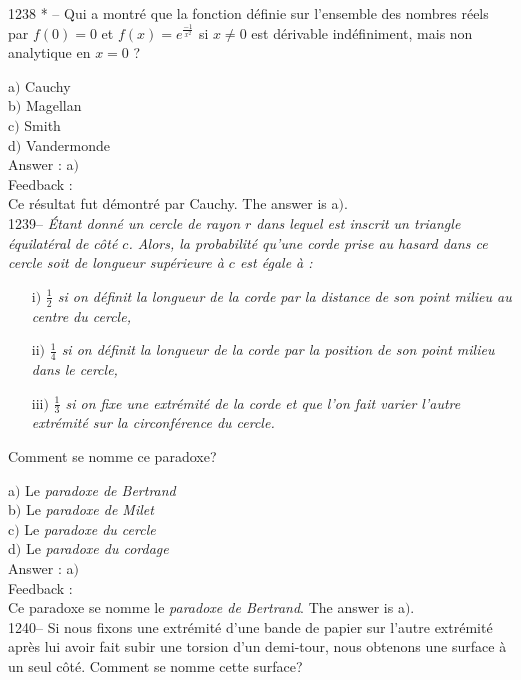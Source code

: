 \documentclass[letterpaper, 12pt]{article}
\begin{document}
1238 * -- Qui a montr\'e que la fonction d\'efinie sur l'ensemble
des nombres r\'eels par $f(0)=0$ et $f(x)=e^{\frac{-1}{x^2}}$ si
$x\not=0$ est d\'erivable ind\'efiniment, mais non analytique en
$x=0$ ?

a$)$ Cauchy \\
b$)$ Magellan \\
c$)$ Smith \\
d$)$ Vandermonde \\

Answer : a$)$\\

Feedback : \\
Ce r\'esultat fut d\'emontr\'e par Cauchy.
The answer is a$)$.\\

1239-- {\sl \'Etant donn\'e un cercle de rayon $r$ dans lequel est
inscrit un triangle \'equilat\'eral de c\^ot\'e $c$. Alors, la
probabilit\'e qu'une corde prise au hasard dans ce cercle soit de
longueur sup\'erieure \`a $c$ est \'egale \`a :}
\begin{enumerate}
\item[i$)$]{\sl $\frac12$ si on d\'efinit la longueur de la corde par la
distance de son point milieu au centre du cercle,}
\item[ii$)$]{\sl $\frac14$ si on d\'efinit la longueur de la corde par la
position de son point milieu dans le cercle,}
\item[iii$)$]{\sl $\frac13$ si on fixe une extr\'emit\'e de la corde et que
l'on fait varier l'autre extr\'emit\'e sur la circonf\'erence du cercle.}
\end{enumerate}
Comment se nomme ce paradoxe?

a$)$ Le {\sl paradoxe de Bertrand} \\
b$)$ Le {\sl paradoxe de Milet} \\
c$)$ Le {\sl paradoxe du cercle}  \\
d$)$ Le {\sl paradoxe du cordage}\\

Answer : a$)$\\

Feedback : \\
Ce paradoxe se nomme le {\sl paradoxe de Bertrand}.
The answer is a$)$.\\



1240-- Si nous fixons une extr\'emit\'e d'une bande de papier sur
l'autre extr\'emit\'e apr\`es lui avoir fait subir une torsion d'un
demi-tour, nous obtenons une surface \`a un seul c\^ot\'e. Comment
se nomme cette surface?
\end{document}
